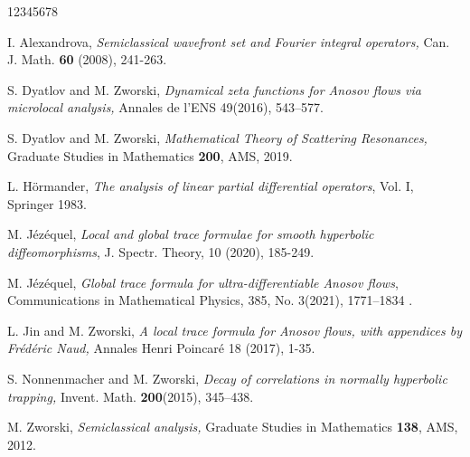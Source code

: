 \documentclass[reqno,12pt,letterpaper]{amsart}
\numberwithin{equation}{section}
\numberwithin{prop}{section}
\begin{document}





















\def\arXiv#1{\href{http://arxiv.org/abs/#1}{arXiv:#1}}

\begin{thebibliography}{12345678}

 I. Alexandrova,
{\em Semiclassical wavefront set and Fourier integral operators,}
Can. J. Math. {\bf 60} (2008), 241-263.


 S. Dyatlov and M. Zworski,
\emph{Dynamical zeta functions for Anosov flows via microlocal analysis,\/} Annales de l'ENS 49(2016), 543–577.

 S. Dyatlov and M. Zworski,
\emph{Mathematical Theory of Scattering Resonances,\/} Graduate Studies in Mathematics {\bf 200}, AMS, 2019.

 L. H\"ormander, 
\emph{The analysis of linear partial differential operators}, Vol. I, Springer 1983.	

 M. J\'ez\'equel, 
\emph{Local and global trace formulae for smooth hyperbolic diffeomorphisms}, J. Spectr. Theory, 10 (2020), 185-249.

 M. J\'ez\'equel, 
\emph{Global trace formula for ultra-differentiable Anosov flows}, Communications in Mathematical Physics, 385, No. 3(2021), 1771--1834 .

 L. Jin and M. Zworski, \emph{A local trace formula for Anosov flows, with appendices by Frédéric Naud,\/} Annales Henri Poincaré 18 (2017), 1-35.

 S. Nonnenmacher and M. Zworski, {\em
Decay of correlations in normally hyperbolic
trapping,} Invent. Math. {\bf 200}(2015), 345--438.

 M. Zworski,
	\emph{Semiclassical analysis,\/}
Graduate Studies in Mathematics {\bf 138}, AMS, 2012.
		
\end{thebibliography}
\end{document}
